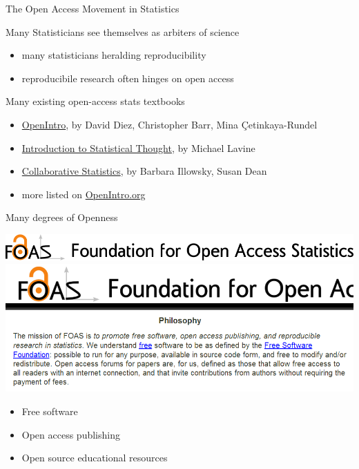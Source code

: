 
\begin{frame}{The Open Access Movement in Statistics}

\begin{block}{Many Statisticians see themselves as arbiters of science}
\begin{itemize}
\item many statisticians heralding reproducibility
\item reproducibile research often hinges on open access
\end{itemize}
\end{block}

\begin{block}{Many existing open-access stats textbooks}
\begin{itemize}
\item \href{http://www.openintro.org/stat}{OpenIntro}, by David Diez, Christopher Barr, Mina \c{C}etinkaya-Rundel
\item \href{http://www.math.umass.edu/~lavine/Book/book.html}{Introduction to Statistical Thought}, by Michael Lavine
\item \href{http://cnx.org/content/col10522/latest/}{Collaborative Statistics}, by Barbara Illowsky, Susan Dean
\item more listed on \href{http://www.openintro.org/stat/extras.php}{OpenIntro.org}
\end{itemize}
\end{block}

\end{frame}


\begin{frame}{Many degrees of Openness}

\includegraphics[width=\linewidth]{FOASLogo.png}
\includegraphics[width=\linewidth]{FOAS.png}

\begin{itemize}
        \item Free software
\pause
	\item Open access publishing
\pause
	\item Open source educational resources
\end{itemize}

\end{frame}


